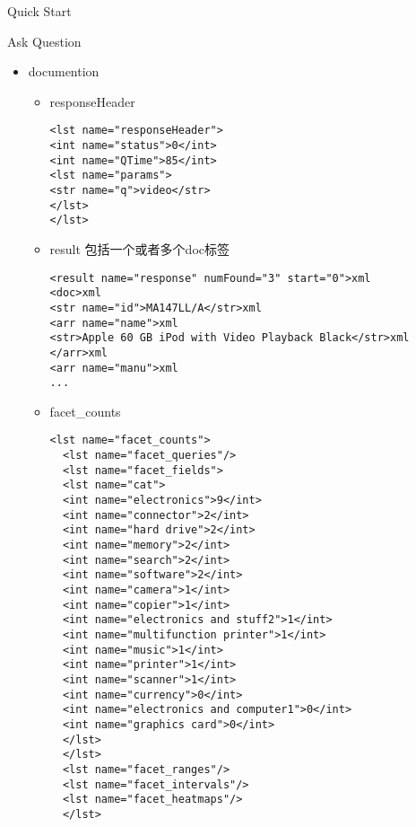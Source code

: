 \documentclass[presentation]{beamer}
\begin{document}
\begin{frame}[fragile,label={sec:org3661264}]{Quick Start}
\begin{block}{Ask Question}
\begin{itemize}
\begin{itemize}
\end{itemize}
\item documention
\begin{itemize}
\item responseHeader
\begin{verbatim}
<lst name="responseHeader">
<int name="status">0</int>
<int name="QTime">85</int>
<lst name="params">
<str name="q">video</str>
</lst>
</lst>
\end{verbatim}
\item result 包括一个或者多个doc标签
\begin{verbatim}
<result name="response" numFound="3" start="0">xml
<doc>xml
<str name="id">MA147LL/A</str>xml
<arr name="name">xml
<str>Apple 60 GB iPod with Video Playback Black</str>xml
</arr>xml
<arr name="manu">xml
...
\end{verbatim}
\item facet\_counts
\begin{verbatim}
<lst name="facet_counts">
  <lst name="facet_queries"/>
  <lst name="facet_fields">
  <lst name="cat">
  <int name="electronics">9</int>
  <int name="connector">2</int>
  <int name="hard drive">2</int>
  <int name="memory">2</int>
  <int name="search">2</int>
  <int name="software">2</int>
  <int name="camera">1</int>
  <int name="copier">1</int>
  <int name="electronics and stuff2">1</int>
  <int name="multifunction printer">1</int>
  <int name="music">1</int>
  <int name="printer">1</int>
  <int name="scanner">1</int>
  <int name="currency">0</int>
  <int name="electronics and computer1">0</int>
  <int name="graphics card">0</int>
  </lst>
  </lst>
  <lst name="facet_ranges"/>
  <lst name="facet_intervals"/>
  <lst name="facet_heatmaps"/>
  </lst>
\end{verbatim}
\end{itemize}
\end{itemize}
\end{block}
\end{frame}
\end{document}
